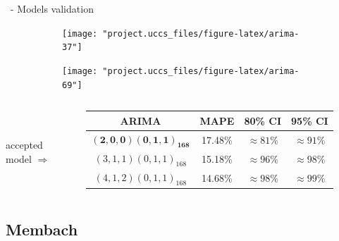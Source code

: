 \documentclass{beamer}
\begin{document}
\begin{frame}{\subsecname~- Models validation}
	\begin{figure}
		\begin{subfigure}{.45\linewidth}
			\texttt{[image: "project.uccs\_files/figure-latex/arima-37"]}
		\end{subfigure}
		\begin{subfigure}{.45\linewidth}
			\texttt{[image: "project.uccs\_files/figure-latex/arima-69"]}
		\end{subfigure}
	\end{figure}
	\begin{columns}[T]
		\raggedleft~\\~\\\vspace{1em}accepted model $\Rightarrow$\hspace{-1.3em}
		\begin{table}
			\begin{tabular}{c | c c c}
				\textbf{ARIMA} & MAPE   & 80\% CI & 95\% CI \\
				\midrule
				$\mathbf{(2,0,0)(0,1,1)_{168}}$ & 17.48\% & $\approx81\%$ & $\approx91\%$ \\
				$(3,1,1)(0,1,1)_{168}$ & 15.18\% & $\approx96\%$ & $\approx98\%$ \\
				$(4,1,2)(0,1,1)_{168}$ & 14.68\% & $\approx98\%$ & $\approx99\%$ \\
			\end{tabular}
		\end{table}
	\end{columns}
\end{frame}

\subsection{Membach}
\end{document}
